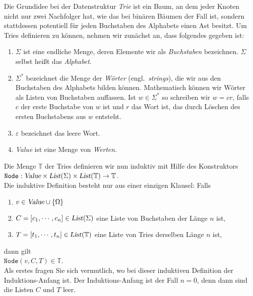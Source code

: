 Die Grundidee bei der Datenstruktur \emph{Trie} ist ein Baum, an dem jeder Knoten nicht
nur zwei Nachfolger hat, wie das bei bin\"aren B\"aumen der Fall ist, sondern stattdessen
potentiell f\"ur jeden Buchstaben des Alphabets einen Ast besitzt.  Um Tries definieren zu
k\"onnen, nehmen wir zun\"achst an, dass folgendes gegeben ist:
\begin{enumerate}
\item $\Sigma$ ist eine endliche Menge, deren Elemente wir als \emph{Buchstaben}
      bezeichnen. $\Sigma$ selbst hei{\ss}t das \emph{Alphabet}.
\item $\Sigma^*$ bezeichnet die Menge der \emph{W\"orter} (engl.~\emph{strings}), die wir aus den Buchstaben
      des Alphabets bilden k\"onnen.  Mathematisch k\"onnen wir W\"orter als Listen von 
      Buchstaben auffassen. Ist $w \in \Sigma^*$ so schreiben wir $w = cr$, falls
      $c$ der erste Buchstabe von $w$ ist und $r$ das Wort ist, das durch L\"oschen des
      ersten Buchstabens aus $w$ entsteht.  
\item $\varepsilon$ bezeichnet das leere Wort.  
\item \textsl{Value} ist eine Menge von \emph{Werten}.  
\end{enumerate}
Die Menge $\mathbb{T}$ der Tries definieren wir nun induktiv mit Hilfe des 
Konstruktors \\[0.2cm]
\hspace*{1.3cm} 
$\texttt{Node}: \textsl{Value} \times \textsl{List}(\Sigma) \times
\textsl{List}(\mathbb{T}) \rightarrow \mathbb{T}$. \\[0.2cm]
Die induktive Definition besteht nur aus einer einzigen Klausel: Falls
\begin{enumerate}
\item $v \in \textsl{Value} \cup \{\Omega\}$
\item $C = [c_1, \cdots, c_n] \in \textsl{List}(\Sigma)$ eine Liste von Buchstaben der
      L\"ange $n$ ist,
\item $T = [t_1, \cdots, t_n] \in \textsl{List}(\mathbb{T})$ eine Liste von Tries derselben L\"ange $n$ ist, 
\end{enumerate}
dann gilt \\[0.2cm]
\hspace*{1.3cm}  $\texttt{Node}(v, C, T) \in \mathbb{T}$.  \\[0.2cm]
Als erstes fragen Sie sich
vermutlich, wo bei dieser induktiven Definition der Induktions-Anfang ist.
Der Induktions-Anfang ist der Fall $n=0$, denn dann sind die Listen $C$ und $T$ leer.
